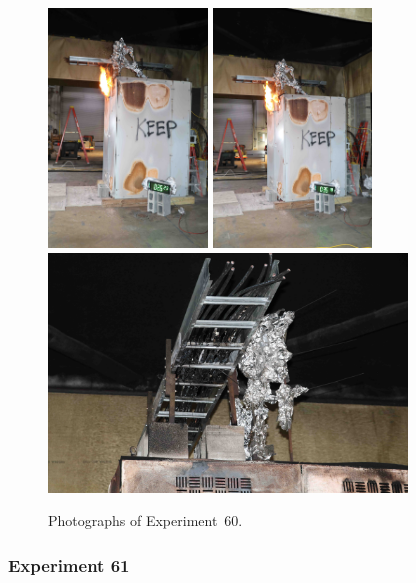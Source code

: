 \begin{figure}[p]
\centering
\includegraphics[height=2.50in,angle=-90]{../FIGURES/Test_60_26_min_23_s}
\includegraphics[height=2.50in,angle=-90]{../FIGURES/Test_60_35_min_18_s} \\
\includegraphics[height=2.50in]{../FIGURES/Test_60_scar}
\caption[Photographs of Experiment~60]{Photographs of Experiment~60.}
\label{fig:Test_60_photos}
\end{figure}


\clearpage

\subsubsection{Experiment 61}


